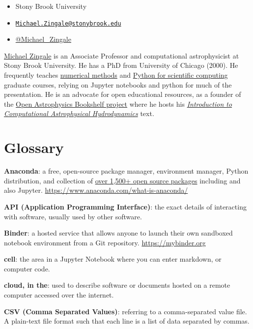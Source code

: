 \documentclass[]{book}
\providecommand{\tightlist}{%
  \setlength{\itemsep}{0pt}\setlength{\parskip}{0pt}}
\begin{document}
\begin{itemize}
\tightlist
\item
  Stony Brook University
\item
  \href{mailto:Michael.Zingale@stonybrook.edu}{\nolinkurl{Michael.Zingale@stonybrook.edu}}
\item
  \href{https://twitter.com/Michael_Zingale}{@Michael\_Zingale}
\end{itemize}

\href{http://www.astro.sunysb.edu/mzingale/}{Michael Zingale} is an
Associate Professor and computational astrophysicist at Stony Brook
University. He has a PhD from University of Chicago (2000). He
frequently teaches
\href{http://bender.astro.sunysb.edu/classes/numerical_methods/}{numerical
methods} and
\href{http://bender.astro.sunysb.edu/classes/python-science/}{Python for
scientific computing} graduate courses, relying on Jupyter notebooks and
python for much of the presentation. He is an advocate for open
educational resources, as a founder of the
\href{https://github.com/Open-Astrophysics-Bookshelf/}{Open Astrophysics
Bookshelf project} where he hosts his
\href{http://bender.astro.sunysb.edu/hydro_by_example/CompHydroTutorial.pdf}{\emph{Introduction
to Computational Astrophysical Hydrodynamics}} text.

\chapter{Glossary}\label{glossary}

\textbf{Anaconda}: a free, open-source package manager, environment
manager, Python distribution, and collection of
\href{https://docs.anaconda.com/anaconda/packages/pkg-docs/}{over 1,500+
open source packages} including and also Jupyter.
\url{https://www.anaconda.com/what-is-anaconda/}

\textbf{API (Application Programming Interface)}: the exact details of
interacting with software, usually used by other software.

\textbf{Binder}: a hosted service that allows anyone to launch their own
sandboxed notebook environment from a Git repository.
\url{https://mybinder.org}

\textbf{cell}: the area in a Jupyter Notebook where you can enter
markdown, or computer code.

\textbf{cloud, in the}: used to describe software or documents hosted on
a remote computer accessed over the internet.

\textbf{CSV (Comma Separated Values)}: referring to a comma-separated
value file. A plain-text file format such that each line is a list of
data separated by commas.
\end{document}
